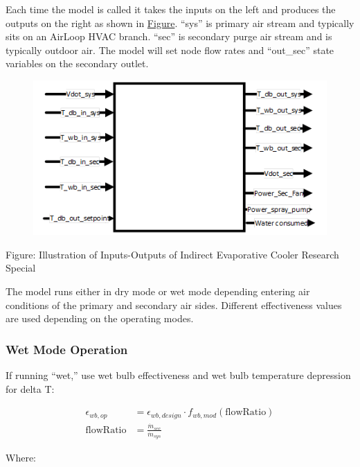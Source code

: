 Each time the model is called it takes the inputs on the left and produces the outputs on the right as shown in \protect\hyperlink{IndEvapCoolerFig2}{Figure}. ``sys'' is primary air stream and typically sits on an AirLoop HVAC branch. ``sec'' is secondary purge air stream and is typically outdoor air. The model will set node flow rates and ``out\_sec'' state variables on the secondary outlet.

\begin{figure}[htbp]
\centering
\includegraphics{media/image8005.png}
\caption{}
\end{figure}

Figure: Illustration of Inputs-Outputs of Indirect Evaporative Cooler Research Special

The model runs either in dry mode or wet mode depending entering air conditions of the primary and secondary air sides. Different effectiveness values are used depending on the operating modes.

\subsubsection{Wet Mode Operation}\label{wet-mode-operation}

If running ``wet,'' use wet bulb effectiveness and wet bulb temperature depression for delta T:

\begin{equation}
\begin{array}{rl}
  \epsilon_{wb,op} & = \epsilon_{wb,design}\cdot f_{wb,mod}\left(\text{flowRatio}\right) \\
  \text{flowRatio} & = \frac{\dot{m}_{sec}}{\dot{m}_{sys}}
\end{array}
\end{equation}

Where:

